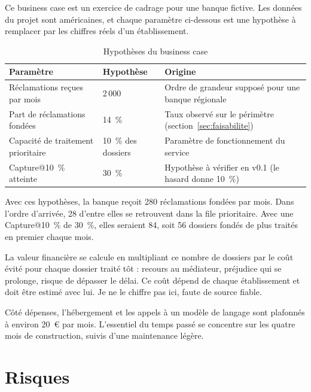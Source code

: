 \documentclass[11pt,a4paper]{article}
\begin{document}
Ce business case est un exercice de cadrage pour une banque fictive. Les données du projet sont américaines, et chaque paramètre ci-dessous est une hypothèse à remplacer par les chiffres réels d'un établissement.

\begin{table}[H]
\centering\small
\begin{tabularx}{\linewidth}{@{}l l Y@{}}
\toprule
Paramètre & Hypothèse & Origine \\
\midrule
Réclamations reçues par mois & 2\,000 & Ordre de grandeur supposé pour une banque régionale \\
Part de réclamations fondées & 14~\% & Taux observé sur le périmètre (section~\ref{sec:faisabilite}) \\
Capacité de traitement prioritaire & 10~\% des dossiers & Paramètre de fonctionnement du service \\
Capture@10~\% atteinte & 30~\% & Hypothèse à vérifier en v0.1 (le hasard donne 10~\%) \\
\bottomrule
\end{tabularx}
\caption{Hypothèses du business case}
\end{table}

Avec ces hypothèses, la banque reçoit 280 réclamations fondées par mois. Dans l'ordre d'arrivée, 28 d'entre elles se retrouvent dans la file prioritaire. Avec une Capture@10~\% de 30~\%, elles seraient 84, soit 56 dossiers fondés de plus traités en premier chaque mois.

La valeur financière se calcule en multipliant ce nombre de dossiers par le coût évité pour chaque dossier traité tôt : recours au médiateur, préjudice qui se prolonge, risque de dépasser le délai. Ce coût dépend de chaque établissement et doit être estimé avec lui. Je ne le chiffre pas ici, faute de source fiable.

Côté dépenses, l'hébergement et les appels à un modèle de langage sont plafonnés à environ 20~€ par mois. L'essentiel du temps passé se concentre sur les quatre mois de construction, suivis d'une maintenance légère.

\section{Risques}
\end{document}
